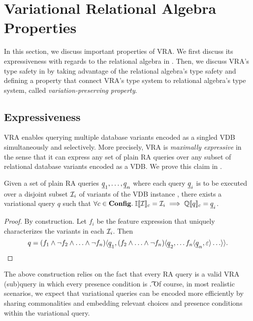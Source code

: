\section{Variational Relational Algebra Properties}
\label{sec:vqlprop}

In this section, we discuss important properties of VRA. We first discuss its expressiveness
with regards to the relational algebra in .
Then, we discuss VRA's type safety in  by taking advantage of the
relational algebra's type safety and defining a property that connect VRA's type 
system to relational algebra's type system, called \emph{variation-preserving property}.

\subsection{Expressiveness}
\label{sec:express}

VRA enables querying multiple database variants encoded as a singled VDB
simultaneously and selectively.
%
More precisely, VRA is \emph{maximally expressive} in the sense that it can
express any set of plain RA queries over any subset of relational database
variants encoded as a VDB. 
We prove this claim in .

\begin{theorem}
\label{thm:max-expr}
Given a set of plain RA queries $\pQ_1,\ldots,\pQ_n$ where each query $\pQ_i$
is to be executed over a disjoint subset $\vdbInst_i$ of variants of the VDB
instance \vdbInst, there exists a variational query $q$ such that
$\forall \config \in \confSet.\; \odbSem{\vdbInst} = \vdbInst_i \implies \eeSem{\vQ} = \pQ_i$.
\end{theorem}

\begin{proof}
By construction. Let $f_i$ be the feature expression that uniquely
characterizes the variants in each $\vdbInst_i$.
Then 
\[
\vQ =
\chc[(\fName_1\wedge\neg \fName_2\wedge\ldots\wedge\neg \fName_n)]{\pQ_1,
  \chc[(\fName_2\wedge\ldots\wedge\neg \fName_n)]{\pQ_2,\ldots
    \chc[\fName_n]{\pQ_n,\emp}\ldots}}.
\]
\end{proof}

\noindent
%
The above construction relies on the fact that every RA query is a valid VRA
(sub)query in which every presence condition is \t.
%
Of course, in most realistic scenarios, we expect that variational queries can be encoded
more efficiently by sharing commonalities and embedding relevant choices and
presence conditions within the variational query.






